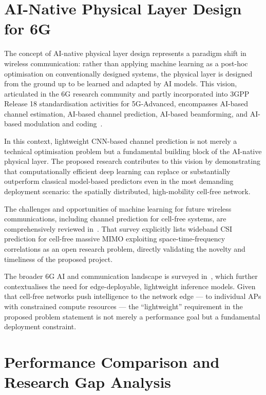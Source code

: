 \documentclass[12pt,a4paper]{article}
\begin{document}
\section{AI-Native Physical Layer Design for 6G}

The concept of AI-native physical layer design represents a paradigm
shift in wireless communication: rather than applying machine learning
as a post-hoc optimisation on conventionally designed systems, the
physical layer is designed from the ground up to be learned and adapted
by AI models. This vision, articulated in the 6G research community
and partly incorporated into 3GPP Release 18 standardisation activities
for 5G-Advanced, encompasses AI-based channel estimation, AI-based
channel prediction, AI-based beamforming, and AI-based modulation and
coding~\cite{overview6G2024}.

In this context, lightweight CNN-based channel prediction is not merely
a technical optimisation problem but a fundamental building block of
the AI-native physical layer. The proposed research contributes to
this vision by demonstrating that computationally efficient deep
learning can replace or substantially outperform classical model-based
predictors even in the most demanding deployment scenario: the
spatially distributed, high-mobility cell-free network.

The challenges and opportunities of machine learning for future wireless
communications, including channel prediction for cell-free systems,
are comprehensively reviewed in~\cite{ML2025future}. That survey
explicitly lists wideband CSI prediction for cell-free massive MIMO
exploiting space-time-frequency correlations as an open research
problem, directly validating the novelty and timeliness of the
proposed project.

The broader 6G AI and communication landscape is surveyed
in~\cite{overview6G2024}, which further contextualises the need for
edge-deployable, lightweight inference models. Given that cell-free
networks push intelligence to the network edge --- to individual APs
with constrained compute resources --- the ``lightweight'' requirement
in the proposed problem statement is not merely a performance goal but
a fundamental deployment constraint.

\section{Performance Comparison and Research Gap Analysis}
\end{document}
